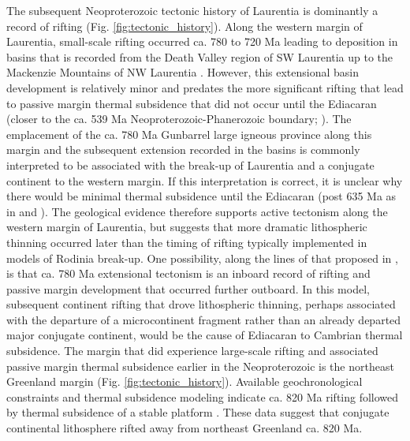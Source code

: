 \documentclass[11pt,letterpaper]{article}
\begin{document}
The subsequent Neoproterozoic tectonic history of Laurentia is dominantly a record of rifting (Fig. \ref{fig:tectonic_history}). Along the western margin of Laurentia, small-scale rifting occurred ca. 780 to 720 Ma leading to deposition in basins that is recorded from the Death Valley region of SW Laurentia up to the Mackenzie Mountains of NW Laurentia \citep{Macdonald2012a, Rooney2017a}. However, this extensional basin development is relatively minor and predates the more significant rifting that lead to passive margin thermal subsidence that did not occur until the Ediacaran (closer to the ca. 539 Ma Neoproterozoic-Phanerozoic boundary; \citealp{Bond1984a, Levy1991a}). The emplacement of the ca. 780 Ma Gunbarrel large igneous province along this margin and the subsequent extension recorded in the basins is commonly interpreted to be associated with the break-up of Laurentia and a conjugate continent to the western margin. If this interpretation is correct, it is unclear why there would be minimal thermal subsidence until the Ediacaran (post 635 Ma as in \citealp{Levy1991a} and \citealp{Witkosky2018a}). The geological evidence therefore supports active tectonism along the western margin of Laurentia, but suggests that more dramatic lithospheric thinning occurred later than the timing of rifting typically implemented in models of Rodinia break-up. One possibility, along the lines of that proposed in \citet{Ross1991a}, is that ca. 780 Ma extensional tectonism is an inboard record of rifting and passive margin development that occurred further outboard. In this model, subsequent continent rifting that drove lithospheric thinning, perhaps associated with the departure of a microcontinent fragment rather than an already departed major conjugate continent, would be the cause of Ediacaran to Cambrian thermal subsidence. The margin that did experience large-scale rifting and associated passive margin thermal subsidence earlier in the Neoproterozoic is the northeast Greenland margin (Fig. \ref{fig:tectonic_history}). Available geochronological constraints and thermal subsidence modeling indicate ca. 820 Ma rifting followed by thermal subsidence of a stable platform \citep{Maloof2006a, Halverson2018a}. These data suggest that conjugate continental lithosphere rifted away from northeast Greenland ca. 820 Ma. 
\end{document}
